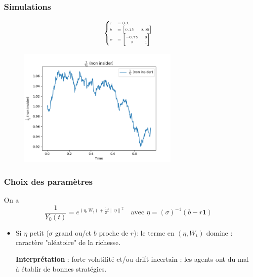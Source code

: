 \documentclass{beamer}
\begin{document}
\begin{frame}
\frametitle{Simulations}
\begin{figure}[H]
\begin{minipage}{.15\textwidth}
\begin{displaymath}
\tiny
\begin{cases}
r &= 0.1 \\
b &= \begin{bmatrix}
		0.15 & 0.05
	\end{bmatrix} \\
\sigma &= \begin{bmatrix}
			-0.75 & 0 \\
			0 & 1
		  \end{bmatrix}
\end{cases}
\end{displaymath}
\end{minipage}%
\begin{minipage}{.85\textwidth}
  \centering
    \includegraphics[width=0.7\textwidth]{images/simulation_3/wealth_non_insider.png}
\end{minipage}
\end{figure}
\end{frame}

\begin{frame}
\frametitle{Choix des paramètres}
\par On a 
\begin{displaymath}
\frac{1}{Y_0 \left( t \right)} = e^{ \left( \eta, W_{t} \right) + \frac{1}{2} t {\| \eta \|}^{2}} \quad \text{avec } \eta = (\sigma)^{-1} (b - r \textbf{1})
\end{displaymath}
\begin{itemize}
\item Si $\eta$ petit ($\sigma$ grand ou/et $b$ proche de $r$): le terme en $\left( \eta, W_{t} \right)$ domine : caractère "aléatoire" de la richesse.
\par \textbf{Interprétation} : forte volatilité et/ou drift incertain : les agents ont du mal à établir de bonnes stratégies.
\end{itemize}
\end{frame}
\end{document}
